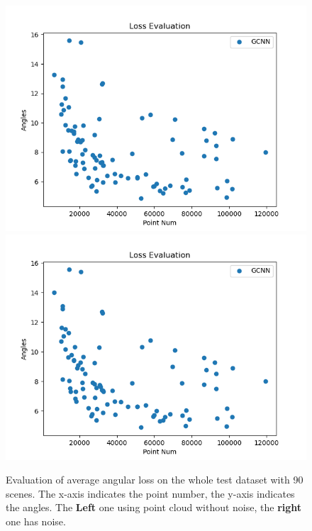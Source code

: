 \begin{figure}[h!]
	\centering
	\includegraphics[width=.4\textwidth]{./Figures/scatter-gcnn-no-noise.png}
	\includegraphics[width=.4\textwidth]{./Figures/scatter-gcnn-noised.png}
	\caption{Evaluation of average angular loss on the whole test dataset with 90 scenes. The x-axis indicates the point number, the y-axis indicates the angles. The \textbf{Left} one using point cloud without noise, the \textbf{right} one has noise.}
	\label{fig:scatter-gcnn}
\end{figure}

